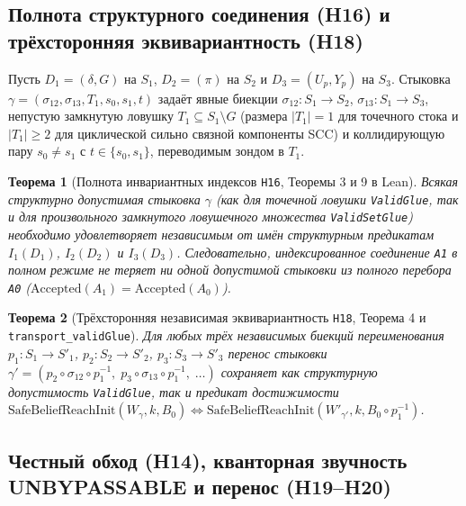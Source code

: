 \documentclass[10pt,a4paper]{article}
\newcommand{\code}[1]{\nolinkurl{#1}}
\newtheorem{theorem}{Теорема}[section]
\begin{document}
\subsection{Полнота структурного соединения (H16) и трёхсторонняя эквивариантность (H18)}

Пусть $D_1 = (\delta, G)$ на $S_1$, $D_2 = (\pi)$ на $S_2$ и $D_3 = (U_p, Y_p)$ на $S_3$. Стыковка $\gamma = (\sigma_{12}, \sigma_{13}, T_1, s_0, s_1, t)$ задаёт явные биекции $\sigma_{12}: S_1 \to S_2$, $\sigma_{13}: S_1 \to S_3$, непустую замкнутую ловушку $T_1 \subseteq S_1 \setminus G$ (размера $|T_1|=1$ для точечного стока и $|T_1| \ge 2$ для циклической сильно связной компоненты SCC) и коллидирующую пару $s_0 \ne s_1$ с $t \in \{s_0, s_1\}$, переводимым зондом в $T_1$.

\begin{theorem}[Полнота инвариантных индексов \code{H16}, Теоремы 3 и 9 в Lean]\label{thm:h16}
Всякая структурно допустимая стыковка $\gamma$ (как для точечной ловушки \code{ValidGlue}, так и для произвольного замкнутого ловушечного множества \code{ValidSetGlue}) необходимо удовлетворяет независимым от имён структурным предикатам $I_1(D_1)$, $I_2(D_2)$ и $I_3(D_3)$. Следовательно, индексированное соединение \code{A1} в полном режиме не теряет ни одной допустимой стыковки из полного перебора \code{A0} ($\mathrm{Accepted}(A_1) = \mathrm{Accepted}(A_0)$).
\end{theorem}

\begin{theorem}[Трёхсторонняя независимая эквивариантность \code{H18}, Теорема 4 и \code{transport_validGlue}]\label{thm:h18}
Для любых трёх \emph{независимых} биекций переименования $p_1: S_1 \to S'_1$, $p_2: S_2 \to S'_2$, $p_3: S_3 \to S'_3$ перенос стыковки $\gamma' = (p_2 \circ \sigma_{12} \circ p_1^{-1},\; p_3 \circ \sigma_{13} \circ p_1^{-1},\; \dots)$ сохраняет как структурную допустимость \code{ValidGlue}, так и предикат достижимости $\mathrm{SafeBeliefReachInit}(W_\gamma, k, B_0) \iff \mathrm{SafeBeliefReachInit}(W'_{\gamma'}, k, B_0 \circ p_1^{-1})$.
\end{theorem}

\subsection{Честный обход (H14), кванторная звучность UNBYPASSABLE и перенос (H19--H20)}
\end{document}
